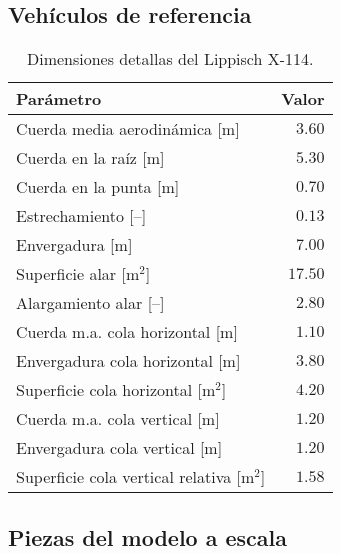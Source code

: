 \subsection{Vehículos de referencia}






\begin{table}[ht]
\centering
\caption{Dimensiones detallas del Lippisch X-114.}
\label{tab:x114dim}
\begin{tabular}{lr}
\toprule
Parámetro                                   & Valor       \\ \midrule
Cuerda media aerodinámica [m]               & $3.60$      \\
Cuerda en la raíz [m]                       & $5.30$      \\
Cuerda en la punta [m]                      & $0.70$      \\
Estrechamiento [–]                          & $0.13$      \\
Envergadura [m]                             & $7.00$      \\
Superficie alar [m$^2$]                     & $17.50$     \\
Alargamiento alar [–]                       & $2.80$      \\ \midrule
Cuerda m.a. cola horizontal [m]             & $1.10$      \\
Envergadura cola horizontal [m]             & $3.80$      \\
Superficie cola horizontal [m$^2$]          & $4.20$      \\ \midrule
Cuerda m.a. cola vertical [m]               & $1.20$      \\
Envergadura cola vertical [m]               & $1.20$      \\
Superficie cola vertical relativa [m$^2$]   & $1.58$      \\ \bottomrule
\end{tabular}
\end{table}

\FloatBarrier

\subsection{Piezas del modelo a escala}

